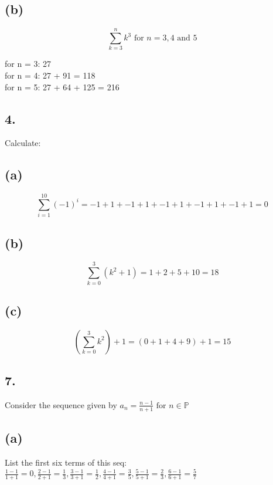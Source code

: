 \documentclass[11pt]{article}
\begin{document}
\subsection*{(b)}
$$\sum_{k=3}^{n} k^{3} \text{ for } n = 3,4 \text{ and } 5$$
\begin{center}
for n = 3: 27\\
for n = 4: 27 + 91 = 118\\
for n = 5: 27 + 64 + 125 = 216\\
\end{center} 
%
%
\subsection*{4.}
\begin{center}
Calculate:
\end{center}

\subsection*{(a)}
$$\sum_{i=1}^{10} (-1)^{i} = -1 + 1 + -1 + 1 + -1 + 1 + -1 + 1 + -1 + 1 = 0$$

\subsection*{(b)}
$$\sum_{k=0}^{3} (k^{2} + 1) = 1 + 2 + 5 + 10 = 18$$

\subsection*{(c)}
$$\left( \sum_{k=0}^{3} k^{2} \right) + 1 = (0 + 1 + 4 + 9  ) + 1 = 15$$
%
%
\subsection*{7.}
\begin{center}
Consider the sequence given by $a_{n} = \frac{n-1}{n+1} \text{ for } n \in \mathbb{P}$
\end{center}

\subsection*{(a)}
\begin{center}
List the first six terms of this seq:\\
\hfill \break
$\frac{1-1}{1+1} = 0, \frac{2-1}{2+1} = \frac{1}{3}, \frac{3-1}{3+1} = \frac{1}{2}, \frac{4-1}{4+1} = \frac{3}{5}, \frac{5-1}{5+1} = \frac{2}{3}, \frac{6-1}{6+1} = \frac{5}{7}$
\end{center}
\end{document}
